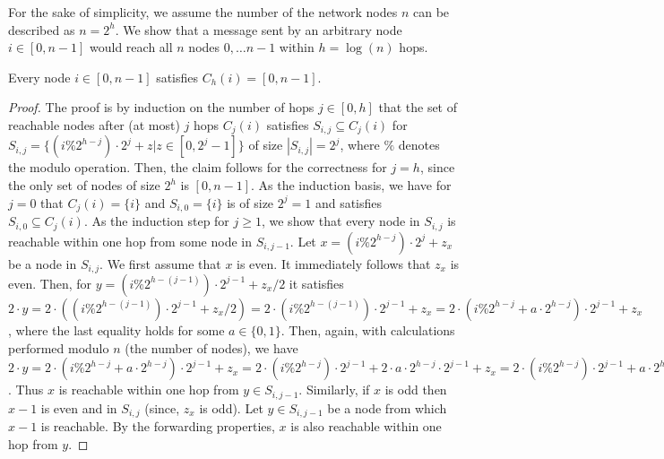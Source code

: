 For the sake of simplicity, we assume the number of the network nodes $n$ can be described as $n = 2^{h}$.
We  show that a message sent by an arbitrary node $i \in [0,n-1]$ would reach all $n$ nodes $0, \ldots n-1$ within $h = \log(n)$ hops.
\begin{claim}{}
\label{claim_log_delay}
Every node $i \in [0,n-1]$ satisfies  $C_{h}(i) = [0,n-1]$.
\end{claim} 
\begin{proof}
The proof is by induction on the number of hops $j \in [0,h]$ that the set of reachable nodes after (at most) $j$ hops $C_{j}(i)$ satisfies  $S_{i,j} \subseteq C_{j}(i)$ for 
$S_{i,j} = \{(i \% 2^{h-j}) \cdot 2^j  + z | z \in [0,2^j-1] \} $  of size $|S_{i,j}| = 2^j$, where $\%$ denotes the modulo operation. Then, the claim follows for the correctness for $j=h$, since the only set of nodes of size $2^h$ is $[0,n-1]$. As the induction basis, we have for $j=0$ that $C_{j}(i) = \{i\}$ and $S_{i,0} = \{i\}$  is of size $2^j = 1$ and satisfies $S_{i,0} \subseteq C_{j}(i)$. As the induction step for $j \ge 1$, we show that every node in $S_{i,j}$ is reachable within one hop from some node in $S_{i,j-1}$. Let $x = (i \% 2^{h-j}) \cdot 2^j  + z_x$ be a node in $S_{i,j}$. We first assume that $x$ is even. It immediately follows that $z_x$ is even. Then,  for 
$y =  (i \% 2^{h-(j-1)}) \cdot 2^{j-1}  + z_x / 2$ it satisfies  $2\cdot y = 2 \cdot ( (i \% 2^{h-(j-1)}) \cdot 2^{j-1}  + z_x / 2) = 2 \cdot (i \% 2^{h-(j-1)}) \cdot 2^{j-1} + z_x = 
2 \cdot (i \% 2^{h-j}   + a \cdot 2^{h-j} ) \cdot 2^{j-1}  + z_x$, where the last equality holds for some $a \in \{0,1\}$. Then, again, with calculations performed modulo $n$ (the number of nodes), we have 
$2\cdot y = 
2 \cdot (i \% 2^{h-j}   + a \cdot 2^{h-j} ) \cdot 2^{j-1}  + z_x = 
2 \cdot (i \% 2^{h-j}) \cdot 2^{j-1}   + 2 \cdot a \cdot 2^{h-j}  \cdot 2^{j-1} + z_x = 
2 \cdot (i \% 2^{h-j}) \cdot 2^{j-1}   + a \cdot 2^{h}  + z_x =
(i \% 2^{h-j}) \cdot 2^{j}   + z_x = x$. Thus $x$ is reachable within one hop from 
$y \in S_{i,j-1}$.
Similarly, if $x$ is odd then $x-1$ is even and in $S_{i,j}$ (since, $z_x$ is odd). Let $y \in S_{i,j-1}$ be a node from which $x-1$ is reachable. By the forwarding properties, $x$ is also reachable within one hop from $y$.  
\end{proof}



